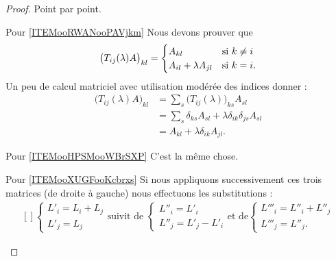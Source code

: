 \begin{proof}
    Point par point.
    \begin{subproof}
        \item[Pour \ref{ITEMooRWANooPAVjkm}]
            Nous devons prouver que
            \begin{equation}
                \big( T_{ij}(\lambda)A \big)_{kl}=\begin{cases}
                    A_{kl}    &   \text{si \( k\neq i\)}\\
                    A_{il}+\lambda A_{jl}    &    \text{si \( k=i\)}.
                \end{cases}
            \end{equation}
            Un peu de calcul matriciel avec utilisation modérée des indices donner :
            \begin{subequations}
                \begin{align}
                    \big( T_{ij}(\lambda)A \big)_{kl}&=\sum_s\big( T_{ij}(\lambda) \big)_{ks}A_{sl}\\
                    &=\sum_s\delta_{ks}A_{sl}+\lambda\delta_{ik}\delta_{js}A_{sl}\\
                    &=A_{kl}+\lambda\delta_{ik}A_{jl}.
                \end{align}
            \end{subequations}
        \item[Pour \ref{ITEMooHPSMooWBrSXP}] C'est la même chose.
        \item[Pour \ref{ITEMooXUGFooKcbrxs}] Si nous appliquons successivement ces trois matrices (de droite à gauche) nous effectuons les substitutions :
            \begin{equation}
                \begin{aligned}[]
                \begin{cases}
                    L'_i=L_i+L_j\\
                    L'_j=L_j
                \end{cases}
                \text{suivit de }
                \begin{cases}
                    L''_i=L'_i\\
                    L''_j=L'_j-L'_i
                \end{cases}
                \text{et de}
                \begin{cases}
                    L'''_i=L''_i+L''_j\\
                    L'''_j=L''_j.

\end{cases}
\end{aligned}
\end{equation}
\end{subproof}
\end{proof}
